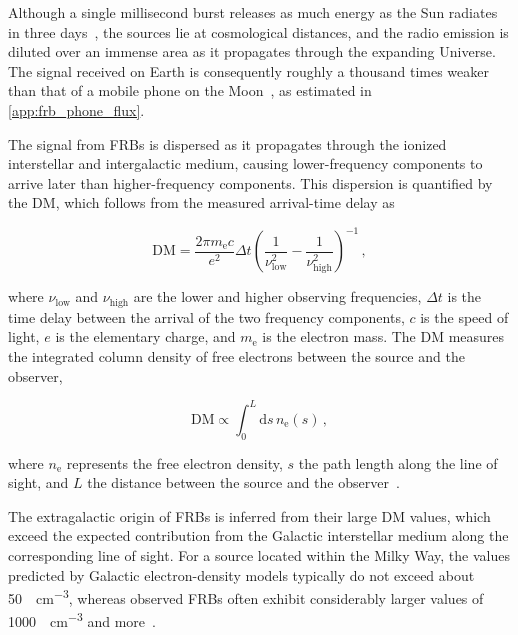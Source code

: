 Although a single millisecond burst releases as much energy as the Sun radiates in three days~\cite{Petroff_2019}, 
the sources lie at cosmological distances, and the radio emission is diluted over an immense area as it propagates 
through the expanding Universe. The signal received on Earth is consequently roughly a thousand times weaker than that 
of a mobile phone on the Moon~\cite{Billings_2013}, as estimated in \autoref{app:frb_phone_flux}.

The signal from FRBs is dispersed as it propagates through the ionized interstellar and intergalactic medium,
causing lower-frequency components to arrive later than higher-frequency components.
This dispersion is quantified by the DM, which follows from the measured arrival-time delay as

\begin{equation}
\mathrm{DM} = \frac{2\pi m_{\mathrm{e}} c}{e^2} \Delta t \left( \frac{1}{\nu_{\mathrm{low}}^2} - \frac{1}{\nu_{\mathrm{high}}^2} \right)^{-1} \,,
\end{equation}

where $\nu_{\mathrm{low}}$ and $\nu_{\mathrm{high}}$ are the lower and higher observing frequencies, $\Delta t$ is the time delay 
between the arrival of the two frequency components, $c$ is the speed of light, $e$ is the elementary charge, and $m_{\mathrm{e}}$ is the electron 
mass. The DM measures the integrated column density of free electrons between the source and the observer,

\begin{equation}
\mathrm{DM} \propto  \int_0^{L} \mathrm{d}s\, n_{\mathrm{e}}(s) \,,
\end{equation}

where $n_{\mathrm{e}}$ represents the free electron density, $s$ the path length along the line of sight, and $L$ the distance between the source and the observer~\cite{Petroff_2019}.

The extragalactic origin of FRBs is inferred from their large DM values, which exceed the expected
contribution from the Galactic interstellar medium along the corresponding line of sight. 
For a source located within the Milky Way, the values predicted by Galactic electron-density models typically 
do not exceed about \qty{50}{\parsec\per\cubic\centi\metre}, whereas observed FRBs often exhibit considerably larger values 
of \qty{1000}{\parsec\per\cubic\centi\metre} and more~\cite{Reischke_2021}.

